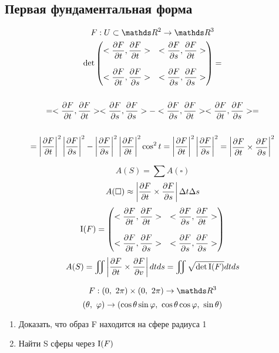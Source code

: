 \documentclass[main]{subfiles}
\begin{document}
    \subsection{Первая фундаментальная форма}

    \begin{Example}
      \[F: U \subset \R^2 \ra \R^3\]
      \begin{multline*}
        $$\det \begin{pmatrix}
          <\dfrac{\d F}{\d t}, \dfrac{\d F}{\d t}> & <\dfrac{\d F}{\d s}, \dfrac{\d F}{\d t}>\\
          \\
          <\dfrac{\d F}{\d t}, \dfrac{\d F}{\d s}> & <\dfrac{\d F}{\d s}, \dfrac{\d F}{\d s}>
        \end{pmatrix} = \\ \\
          = <\frac{\d F}{\d t}, \frac{\d F}{\d t}> <\frac{\d F}{\d s}, \frac{\d F}{\d s}> - <\frac{\d F}{\d s}, \frac{\d F}{\d t}> <\frac{\d F}{\d t}, \dfrac{\d F}{\d s}> =\\ \\
         =\abs{\dfrac{\d F}{\d t}}^2 \abs{\dfrac{\d F}{\d s}}^2 - \abs{\dfrac{\d F}{\d s}}^2 \abs{\dfrac{\d F}{\d t}}^2 \cos^2 t = \abs{\dfrac{\d F}{\d t}}^2 \abs{\dfrac{\d F}{\d s}}^2
        =
        \begin{vmatrix}
          \dfrac{\d F}{\d t} \times \dfrac{\d F}{\d s}
        \end{vmatrix}^2$$
      \end{multline*}
    \end{Example}

    \begin{Remark}
      \[A(S)=\sum A(\square)\]
      \[A(\square) \approx \left|\dfrac{\partial F}{\partial t} \times \dfrac{\partial F}{\partial s}\right| \Delta t \Delta s\]
      \[\RNumb{1}(F)= \begin{pmatrix}
        <\dfrac{\d F}{\d t}, \dfrac{\d F}{\d t}> & <\dfrac{\d F}{\d s}, \dfrac{\d F}{\d t}>\\
        \\
        <\dfrac{\d F}{\d t}, \dfrac{\d F}{\d s}> & <\dfrac{\d F}{\d s}, \dfrac{\d F}{\d s}>
      \end{pmatrix}\]
      \[A(S)= \iint \abs{\dfrac{\d F}{\d t} \times \dfrac{\d F}{\d v}} dt ds = \iint \sqrt{\det \RNumb{1}(F)} dt ds\]
    \end{Remark}

    \begin{Task}
      \[F: (0,\ 2\pi) \times (0,\ 2\pi) \ra \R^3\]
      \[(\theta,\ \varphi) \rightarrow (\cos \theta \sin \varphi,\ \cos \theta \cos \varphi,\ \sin \theta)\]
      \begin{enumerate}
        \item Доказать, что образ F находится на сфере радиуса 1
        \item Найти S сферы через $\RNumb{1}(F)$
      \end{enumerate}
    \end{Task}
\end{document}
